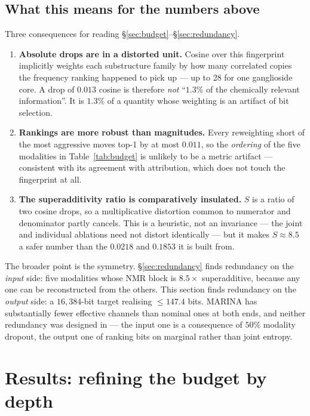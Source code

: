 \documentclass[11pt]{article}
\theoremstyle{plain}
\theoremstyle{remark}
\begin{document}
\subsection{What this means for the numbers above}

Three consequences for reading \S\ref{sec:budget}--\S\ref{sec:redundancy}.

\begin{enumerate}
  \item \textbf{Absolute drops are in a distorted unit.} Cosine over this
    fingerprint implicitly weights each substructure family by how many
    correlated copies the frequency ranking happened to pick up --- up to 28
    for one ganglioside core. A drop of $0.013$ cosine is therefore \emph{not}
    ``$1.3\%$ of the chemically relevant information''. It is $1.3\%$ of a
    quantity whose weighting is an artifact of bit selection.
  \item \textbf{Rankings are more robust than magnitudes.} Every reweighting
    short of the most aggressive moves top-1 by at most $0.011$, so the
    \emph{ordering} of the five modalities in Table~\ref{tab:budget} is
    unlikely to be a metric artifact --- consistent with its agreement with
    attribution, which does not touch the fingerprint at all.
  \item \textbf{The superadditivity ratio is comparatively insulated.} $S$ is a
    ratio of two cosine drops, so a multiplicative distortion common to
    numerator and denominator partly cancels. This is a heuristic, not an
    invariance --- the joint and individual ablations need not distort
    identically --- but it makes $S \approx 8.5$ a safer number than the
    $0.0218$ and $0.1853$ it is built from.
\end{enumerate}

\noindent
The broader point is the symmetry. \S\ref{sec:redundancy} finds redundancy on
the \emph{input} side: five modalities whose NMR block is $8.5\times$
superadditive, because any one can be reconstructed from the others. This
section finds redundancy on the \emph{output} side: a $16{,}384$-bit target
realising $\le 147.4$ bits. MARINA has substantially fewer effective channels
than nominal ones at both ends, and neither redundancy was designed in --- the
input one is a consequence of $50\%$ modality dropout, the output one of
ranking bits on marginal rather than joint entropy.

\FloatBarrier
\section{Results: refining the budget by depth}
\label{sec:depth}
\end{document}
